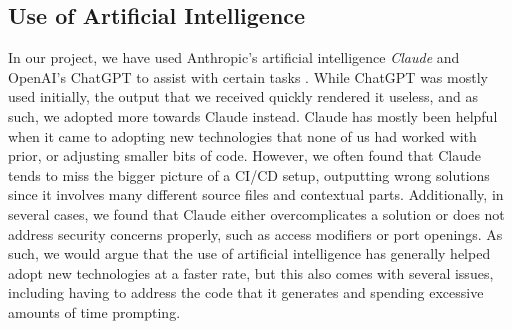 \subsection{Use of Artificial Intelligence} %
In our project, we have used Anthropic’s artificial intelligence \textit{Claude} and OpenAI’s ChatGPT to assist with certain tasks \parencite{chat,claude}. While ChatGPT was mostly used initially, the output that we received quickly rendered it useless, and as such, we adopted more towards Claude instead. Claude has mostly been helpful when it came to adopting new technologies that none of us had worked with prior, or adjusting smaller bits of code. However, we often found that Claude tends to miss the bigger picture of a CI/CD setup, outputting wrong solutions since it involves many different source files and contextual parts. Additionally, in several cases, we found that Claude either overcomplicates a solution or does not address security concerns properly, such as access modifiers or port openings. As such, we would argue that the use of artificial intelligence has generally helped adopt new technologies at a faster rate, but this also comes with several issues, including having to address the code that it generates and spending excessive amounts of time prompting. 